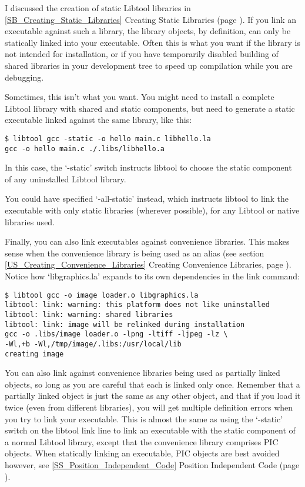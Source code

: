 I discussed the creation of static Libtool libraries 
in \ref{SB_Creating_Static_Libraries} Creating Static Libraries (page
\pageref{SB_Creating_Static_Libraries}). If you link an executable against such a library, the library objects, by definition, can only be statically linked into your executable. Often this is what you want if the library is not intended for installation, or if you have temporarily disabled building of shared libraries in your development tree to speed up compilation while you are debugging. 


Sometimes, this isn't what you want. You might need to install a complete Libtool library with shared and static components, but need to generate a static executable linked against the same library, like this: 

\begin{Verbatim}
$ libtool gcc -static -o hello main.c libhello.la
gcc -o hello main.c ./.libs/libhello.a
\end{Verbatim}

In this case, the `-static' switch instructs libtool to choose the static component of any uninstalled Libtool library. 


You could have specified `-all-static' instead, which instructs libtool to link the executable with only static libraries (wherever possible), for any Libtool or native libraries used. 


Finally, you can also link executables against convenience libraries. This 
makes sense when the convenience library is being used as an alias (see section
\ref {US_Creating_Convenience_Libraries} Creating Convenience Libraries, page 
\pageref{US_Creating_Convenience_Libraries}). Notice how `libgraphics.la' 
expands to its own dependencies in the link command:

\begin{Verbatim}
$ libtool gcc -o image loader.o libgraphics.la
libtool: link: warning: this platform does not like uninstalled
libtool: link: warning: shared libraries
libtool: link: image will be relinked during installation
gcc -o .libs/image loader.o -lpng -ltiff -ljpeg -lz \
-Wl,+b -Wl,/tmp/image/.libs:/usr/local/lib
creating image
\end{Verbatim}

 You can also link against convenience libraries being used as partially linked objects, so long as you are careful that each is linked only once. Remember that a partially linked object is just the same as any other object, and that if you load it twice (even from different libraries), you will get multiple definition errors when you try to link your executable. This is almost the same as using the `-static' switch on the libtool link line to link an executable with the static component of a normal Libtool library, except that the convenience library comprises PIC objects. When statically linking an executable, PIC objects are best avoided however, see \ref{SS_Position_Independent_Code} Position Independent 
 Code (page \pageref{SS_Position_Independent_Code}). 

